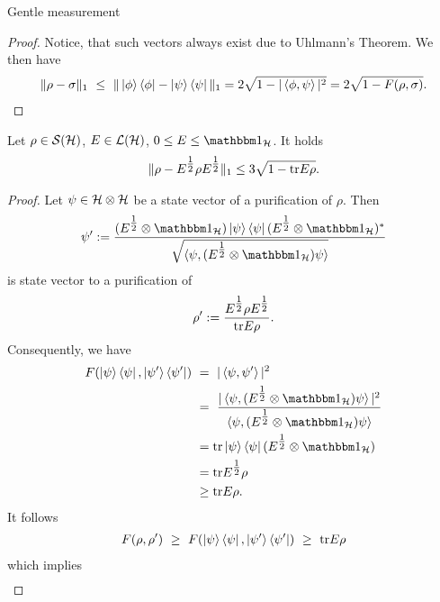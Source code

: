 \begin{subsubsection}{Gentle measurement}
\begin{proof}
       Notice, that such vectors always exist due to Uhlmann's Theorem. We then have
       \begin{align}
        \| \rho - \sigma\|_1 \ \leq \ \|\ket{\phi}\bra{\phi} - \ket{\psi}\bra{\psi}\|_1 = 2 \sqrt{1- |\braket{\phi, \psi}|^2} = 2 \sqrt{1 - F(\rho,\sigma)}.
       \end{align}
       \end{proof}
      \begin{theorem} \label{theorem:gentle_measurement}
        Let $\rho \in {\mathcal S}({\mathcal H})$, $E \in {\mathcal L}({\mathcal H})$, $0 \leq E \leq \bbmeins_\cH$. It holds
        \begin{align}
         \|\rho - E^{\tfrac{1}{2}}\rho E^{\tfrac{1}{2}}\|_1 \leq 3 \sqrt{1 - \mathrm{tr} E\rho}.
        \end{align}
        \end{theorem}
        \begin{proof}
         Let $\psi \in {\mathcal H} \otimes {\mathcal H}$ be a state vector of a purification of $\rho$. Then 
         \begin{align}
           \psi' := \frac{(E^{\tfrac{1}{2}} \otimes \bbmeins_\cH)\ket{\psi}\bra{\psi}(E^{\tfrac{1}{2}} \otimes \bbmeins_\cH)^\ast}{\sqrt{\braket{\psi, 
           (E^{\tfrac{1}{2}} \otimes \bbmeins_\cH) \psi}}}
         \end{align}
	is state vector to a purification of 
	\begin{align}
	 \rho' := \frac{E^{\tfrac{1}{2}}\rho E^{\tfrac{1}{2}}}{\mathrm{tr} E \rho}.
	\end{align}
        Consequently, we have
        \begin{align}
         F(\ket{\psi}\bra{\psi}, \ket{\psi'}\bra{\psi'}) 
         \ & = \ |\braket{\psi,\psi'}|^2 \\
         \ & = \ \frac{|\braket{\psi,(E^{\tfrac{1}{2}} \otimes \bbmeins_\cH)\psi}|^2}{\braket{\psi,(E^{\tfrac{1}{2}} \otimes \bbmeins_\cH)\psi}} \\
         \ & = \tr \ket{\psi}\bra{\psi}(E^{\tfrac{1}{2}} \otimes \bbmeins_\cH) \\
         \ & = \tr E^{\tfrac{1}{2}}\rho  \\
         \ & \geq \tr E \rho.
        \end{align}
	It follows
	\begin{align}
	 F(\rho,\rho') \ \geq \ F(\ket{\psi}\bra{\psi}, \ket{\psi'}\bra{\psi'}) \ \geq \ \mathrm{tr} E \rho
	\end{align}
        which implies
        \begin{align}

\end{align}
\end{proof}
\end{subsubsection}

